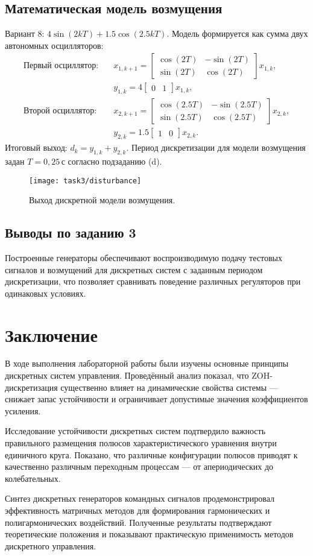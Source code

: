 \section{Математическая модель возмущения}
Вариант 8: \(4\sin(2kT) + 1.5\cos(2.5kT)\). Модель формируется как сумма двух автономных осцилляторов:
\begin{align}
  \text{Первый осциллятор:} \quad &x_{1,k+1} = \begin{bmatrix} \cos(2T) & -\sin(2T) \\ \sin(2T) & \cos(2T) \end{bmatrix} x_{1,k}, \\
  &y_{1,k} = 4 \begin{bmatrix} 0 & 1 \end{bmatrix} x_{1,k}, \\
  \text{Второй осциллятор:} \quad &x_{2,k+1} = \begin{bmatrix} \cos(2.5T) & -\sin(2.5T) \\ \sin(2.5T) & \cos(2.5T) \end{bmatrix} x_{2,k}, \\
  &y_{2,k} = 1.5 \begin{bmatrix} 1 & 0 \end{bmatrix} x_{2,k}.
\end{align}
Итоговый выход: \(d_k = y_{1,k} + y_{2,k}\). Период дискретизации для модели возмущения задан \(T=0{,}25\,\text{с}\) согласно подзаданию (d).
\begin{figure}[H]
  \centering
  \texttt{[image: task3/disturbance]}
  \caption{Выход дискретной модели возмущения.}
\end{figure}

\section*{Выводы по заданию 3}
Построенные генераторы обеспечивают воспроизводимую подачу тестовых сигналов и возмущений для дискретных систем с заданным периодом дискретизации, что позволяет сравнивать поведение различных регуляторов при одинаковых условиях.

\chapter{Заключение}

В ходе выполнения лабораторной работы были изучены основные принципы дискретных систем управления. Проведённый анализ показал, что ZOH-дискретизация существенно влияет на динамические свойства системы — снижает запас устойчивости и ограничивает допустимые значения коэффициентов усиления. 

Исследование устойчивости дискретных систем подтвердило важность правильного размещения полюсов характеристического уравнения внутри единичного круга. Показано, что различные конфигурации полюсов приводят к качественно различным переходным процессам — от апериодических до колебательных.

Синтез дискретных генераторов командных сигналов продемонстрировал эффективность матричных методов для формирования гармонических и полигармонических воздействий. Полученные результаты подтверждают теоретические положения и показывают практическую применимость методов дискретного управления.
